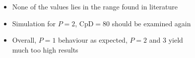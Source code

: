 \begin{frame}[allowframebreaks]
			\begin{columns}[t]
				\column[]{5cm}
				\begin{itemize}
					\item None of the values lies in the range found in literature
					\item Simulation for $P=2$, $\text{CpD}=80$ should be examined again
					\item Overall, $P=1$ behaviour as expected,  $P=2$ and $3$ yield much too high results
				\end{itemize}
				\column[]{7cm}
				\begin{figure}[htp]
					\centering		
					
				\end{figure}
			\end{columns}
		\end{frame}

